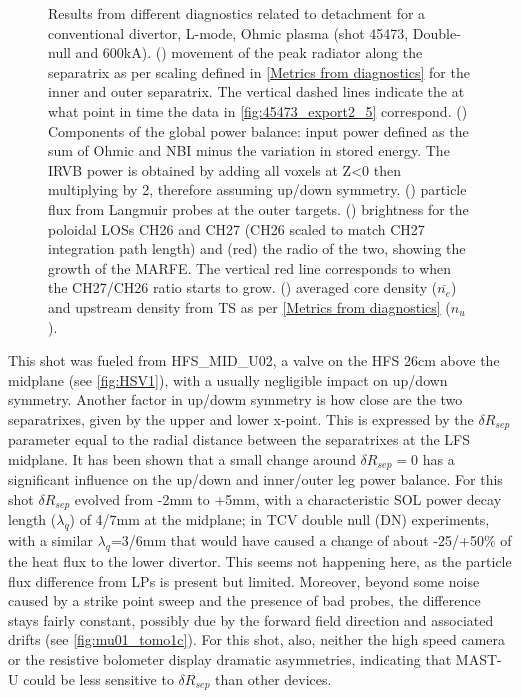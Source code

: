 \begin{figure}
     \caption{Results from different diagnostics related to detachment for a conventional divertor, L-mode, Ohmic plasma (shot 45473, Double-null and 600kA). () movement of the peak radiator along the separatrix as per scaling defined in \autoref{Metrics from diagnostics} for the inner and outer separatrix. The vertical dashed lines indicate the at what point in time the data in \autoref{fig:45473_export2_5} correspond. () Components of the global power balance: input power defined as the sum of Ohmic and NBI minus the variation in stored energy. The IRVB power is obtained by adding all voxels at Z<0 then multiplying by 2, therefore assuming up/down symmetry. () particle flux from Langmuir probes at the outer targets. () brightness for the poloidal LOSs CH26 and CH27 (CH26 scaled to match CH27 integration path length) and (red) the radio of the two, showing the growth of the MARFE. The vertical red line corresponds to when the CH27/CH26 ratio starts to grow. () averaged core density ($\overline{n_e}$) and upstream density from TS as per \autoref{Metrics from diagnostics} ($n_u$).}
	\label{fig:mu01_tomo1}
\end{figure}

This shot was fueled from HFS\_MID\_U02, a valve on the HFS 26cm above the midplane (see \autoref{fig:HSV1}), with a usually negligible impact on up/down symmetry. Another factor in up/dowm symmetry is how close are the two separatrixes, given by the upper and lower x-point. This is expressed by the $\delta R_{sep}$ parameter equal to the radial distance between the separatrixes at the LFS midplane. It has been shown that a small change around $\delta R_{sep}=0$ has a significant influence on the up/down and inner/outer leg power balance.\cite{Fevrier2021} For this shot $\delta R_{sep}$ evolved from -2mm to +5mm, with a characteristic SOL power decay length ($\lambda_q$) of 4/7mm at the midplane; in TCV double null (DN) experiments, with a similar $\lambda_q$=3/6mm that would have caused a change of about -25/+50\% of the heat flux to the lower divertor.\cite{Potzel2014} This seems not happening here, as the particle flux difference from LPs is present but limited. Moreover, beyond some noise caused by a strike point sweep and the presence of bad probes, the difference stays fairly constant, possibly due by the forward field direction and associated drifts (see \autoref{fig:mu01_tomo1c}). For this shot, also, neither the high speed camera or the resistive bolometer display dramatic asymmetries, indicating that MAST-U could be less sensitive to $\delta R_{sep}$ than other devices.

